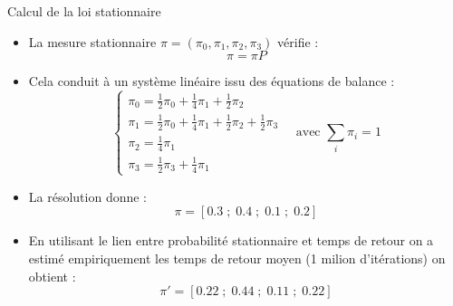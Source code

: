 \documentclass{beamer}
\begin{document}
\begin{frame}{Calcul de la loi stationnaire}
\begin{itemize}
  \item La mesure stationnaire $\pi = (\pi_0,\pi_1,\pi_2,\pi_3)$ vérifie :
  \[
  \pi = \pi P
  \]
  \item Cela conduit à un système linéaire issu des équations de balance :
  \[
  \begin{cases}
  \pi_0 = \tfrac12 \pi_0 + \tfrac14 \pi_1 + \tfrac12 \pi_2 \\
  \pi_1 = \tfrac12 \pi_0 + \tfrac14 \pi_1 + \tfrac12 \pi_2 + \tfrac12 \pi_3 \\
  \pi_2 = \tfrac14 \pi_1 \\
  \pi_3 = \tfrac12 \pi_3 + \tfrac14 \pi_1
  \end{cases}
  \quad \text{avec } \sum_i \pi_i = 1
  \]
  \item La résolution donne :
  \[
  \pi = [0.3 \; ; \; 0.4 \; ; \; 0.1 \; ; \; 0.2]
  \]
  \item En utilisant le lien entre probabilité stationnaire et temps de retour on a estimé empiriquement les temps de retour moyen (1 milion d'itérations) on obtient :
  \[
  \pi' = [0.22 \; ; \; 0.44 \; ; \; 0.11 \; ; \; 0.22]
  \]
\end{itemize}
\end{frame}
\end{document}
